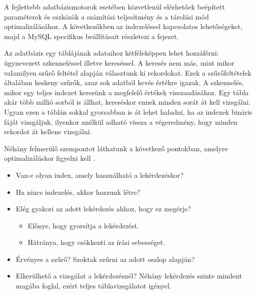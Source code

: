 

A fejlettebb adatbázismotorok esetében közvetlenül elérhetőek beépített paraméterek és eszközök a számítási teljesítmény és a tárolási mód optimalizálásához. A következőkben az indexeléssel kapcsolatos lehetőségeket, majd a MySQL specifikus beállításait részletezi a fejezet.


Az adatbázis egy táblájának adataihoz kétféleképpen lehet hozzáférni: úgynevezett szkenneléssel illetve kereséssel. A keresés nem más, mint mikor valamilyen szűrő feltétel alapján választunk ki rekordokat. Ezek a szűrőfeltételek általában keskeny szűrők, azaz sok adatból kevés értékre igazak. A szkennelés, mikor egy teljes indexet keresünk a megfelelő értékek visszaadásához. Egy tábla akár több millió sorból is állhat, kereséskor ennek minden sorát át kell vizsgálni. Ugyan ezen a táblán sokkal gyorsabban is át lehet haladni, ha az indexek bináris fáját vizsgáljuk, ilyenkor anélkül adható vissza a végeredmény, hogy minden rekordot át kellene vizsgálni.

Néhány felmerülő szempontot láthatunk a következő pontokban, amelyre optimalizáláskor figyelni kell \cite{manolopoulos2012advanced}.
\begin{itemize}
\item Van-e olyan index, amely használható a lekérdezéskor?
\item Ha nincs indexelés, akkor hozzunk létre?
\item Elég gyakori az adott lekérdezés ahhoz, hogy ez megérje?
\begin{itemize}
\item Előnye, hogy gyorsítja a lekérdezést.
\item Hátránya, hogy csökkenti az írási sebességet.
\end{itemize}
\item Érvényes a szűrő? Szoktak szűrni az adott oszlop alapján?
\item Elkerülhető a vizsgálat a lekérdezésnél? Néhány lekérdezés szinte mindent magába foglal, ezért teljes táblavizsgálatot igényel.
\end{itemize}



